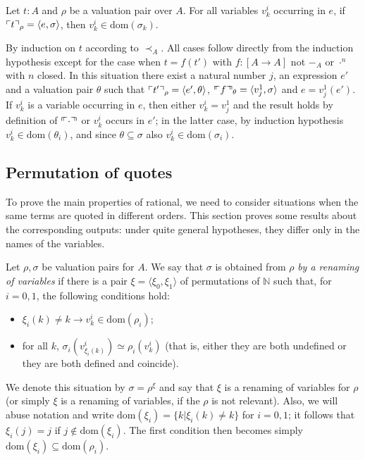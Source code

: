 \documentclass[numreferences]{kluwer}
\newcommand{\tacticname}[1]{\textsf{#1}}
\newcommand{\rational}{\tacticname{rational}}
\newcommand{\less}{\mathrel{\prec_A}}
\newcommand{\nat}{{\mathbb N}}
\newcommand{\mlfnv}[2]{\ensuremath\ulcorner\!\!\ulcorner{#1}\urcorner\!\!\urcorner_{#2}}
\newcommand{\mlfn}[2]{\ensuremath\ulcorner{#1}\urcorner_{#2}}
\newcommand{\domain}{\ensuremath{\mathrm{dom}}}
\newcommand{\renamevar}[2]{\ensuremath{{#1}^{#2}}}
\newcommand{\isrenamevar}[3]{\ensuremath{{#1}=\renamevar{#2}{#3}}}
\begin{document}
\begin{article}
\begin{lemma}\label{quotedom}
Let $t:A$ and $\rho$ be a valuation pair over $A$.
For all variables $v^i_k$ occurring in $e$, if
$\mlfn{t}{\rho}=\langle e,\sigma\rangle$, then $v^i_k\in\domain(\sigma_k)$.
\end{lemma}
\begin{pf}
By induction on $t$ according to $\less$.  All cases follow directly from
the induction hypothesis except for the case when $t=f(t')$ with $f:[A\to A]$
not $-_A$ or $\cdot^n$ with $n$ closed.  In this situation
there exist a natural number $j$, an expression $e'$
and a valuation pair $\theta$ such that
$\mlfn{t'}{\rho}=\langle e',\theta\rangle$,
$\mlfnv{f}{\theta}=\langle v^1_j,\sigma\rangle$ and $e=v^1_j(e')$.
If $v^i_k$ is a variable occurring in $e$, then either $v^i_k=v^1_j$ and
the result holds by definition of $\mlfnv{\cdot}{}$ or $v^i_k$ occurs in $e'$;
in the latter case, by induction hypothesis $v^i_k\in\domain(\theta_i)$, and
since $\theta\subseteq\sigma$ also $v^i_k\in\domain(\sigma_i)$.
\end{pf}

\subsection{Permutation of quotes}

To prove the main properties of {\rational}, we need to consider situations
when the same terms are quoted in different orders.
This section proves some results about the corresponding outputs: under
quite general hypotheses, they differ only in the names of the variables.

\begin{definition}\label{renamevars}
Let $\rho,\sigma$ be valuation pairs for $A$.  We say that $\sigma$ is
obtained from $\rho$ \emph{by a renaming of variables} if there is a pair
$\xi=\langle\xi_0,\xi_1\rangle$ of permutations of $\nat$ such that,
for $i=0,1$, the following conditions hold:
\begin{itemize}
\item $\xi_i(k)\neq k\rightarrow v^i_k\in\domain(\rho_i)$;
\item for all $k$, $\sigma_i\left(v^i_{\xi_i(k)}\right)\simeq\rho_i(v^i_k)$
(that is, either they are both undefined or they are both defined and
coincide).
\end{itemize}
We denote this situation by {\isrenamevar\sigma\rho\xi} and say that $\xi$ is
a renaming of variables for $\rho$ (or simply $\xi$ is a renaming of
variables, if the $\rho$ is not relevant).
Also, we will abuse notation and write $\domain(\xi_i)=\{k|\xi_i(k)\neq k\}$
for $i=0,1$; it follows that $\xi_i(j)=j$ if $j\not\in\domain(\xi_i)$.  The
first condition then becomes simply $\domain(\xi_i)\subseteq\domain(\rho_i)$.
\end{definition}


\end{article}
\end{document}
